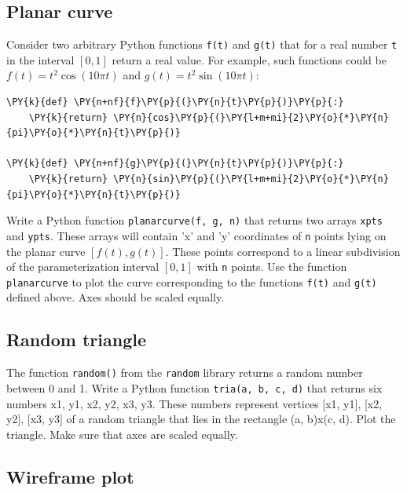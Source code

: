 
\subsection{Planar curve}

Consider two arbitrary Python functions {\tt f(t)} and {\tt g(t)} that 
for a real number {\tt t} in the interval $[0, 1]$ return a real value. 
For example, such functions could be $f(t) = t^2 \cos(10 \pi t)$ and 
$g(t) = t^2 \sin(10 \pi t)$:

\begin{Verbatim}[commandchars=\\\{\}]
\PY{k}{def} \PY{n+nf}{f}\PY{p}{(}\PY{n}{t}\PY{p}{)}\PY{p}{:}
    \PY{k}{return} \PY{n}{cos}\PY{p}{(}\PY{l+m+mi}{2}\PY{o}{*}\PY{n}{pi}\PY{o}{*}\PY{n}{t}\PY{p}{)}

\PY{k}{def} \PY{n+nf}{g}\PY{p}{(}\PY{n}{t}\PY{p}{)}\PY{p}{:}
    \PY{k}{return} \PY{n}{sin}\PY{p}{(}\PY{l+m+mi}{2}\PY{o}{*}\PY{n}{pi}\PY{o}{*}\PY{n}{t}\PY{p}{)}
\end{Verbatim}
Write a Python function {\tt planarcurve(f, g, n)} that returns two
arrays {\tt xpts} and {\tt ypts}. These arrays will contain 'x' and 'y' coordinates of 
{\tt n} points lying on the planar curve $[f(t), g(t)]$. These points 
correspond to a linear subdivision of the parameterization interval 
$[0, 1]$ with {\tt n} points. Use the function {\tt planarcurve} to
plot the curve corresponding to the functions {\tt f(t)} and {\tt g(t)} 
defined above. Axes should be scaled equally.


\subsection{Random triangle}

The function {\tt random()} from the {\tt random} library returns a random number between 0 and 1.  
Write a Python function {\tt tria(a, b, c, d)} that returns six numbers x1, y1, x2, y2, x3, y3. These numbers 
represent vertices [x1, y1], [x2, y2], [x3, y3] of a random triangle that lies in the rectangle (a, b)x(c, d). 
Plot the triangle. Make sure that axes are scaled equally.


\subsection{Wireframe plot}


